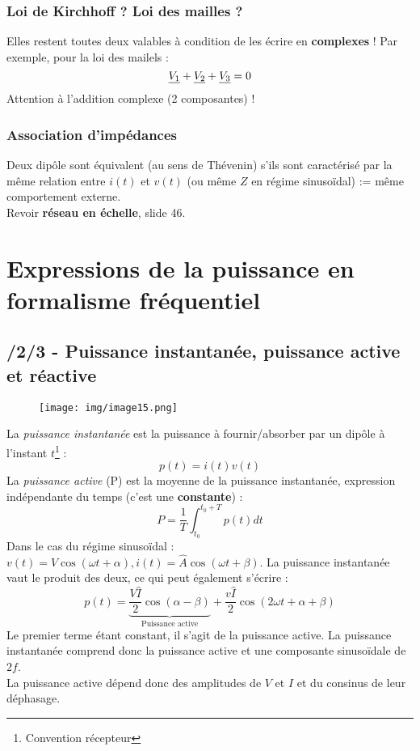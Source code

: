 \documentclass[british,french,11pt, a4paper, openany]{book}
\begin{document}
		\subsubsection{Loi de Kirchhoff ? Loi des mailles ?}
		Elles restent toutes deux valables à condition de les écrire en \textbf{complexes} ! Par exemple, pour la loi des mailels :
		\begin{equation}
		\underline{V_1} + \underline{V_2} + \underline{V_3} = 0
		\end{equation}
		Attention à l'addition complexe (2 composantes) !
		
		\subsubsection{Association d'impédances}
		Deux dipôle sont équivalent (au sens de Thévenin) s'ils sont caractérisé par la même relation entre $i(t)$ et $v(t)$ (ou même $Z$ en régime sinusoïdal) := même comportement externe.\\
		Revoir \textbf{réseau en échelle}, slide 46.
		
		\section{Expressions de la puissance en formalisme fréquentiel}
		\subsection{/2/3 - Puissance instantanée, puissance active et réactive}
		\begin{wrapfigure}[7]{l}{4.7cm}
			\texttt{[image: img/image15.png]}
		\end{wrapfigure}
		La \textit{puissance instantanée} est la puissance à fournir/absorber par un dipôle à l'instant $t$\footnote{Convention récepteur} :
		\begin{equation}
		p(t) = i(t)v(t)
		\end{equation}
		La \textit{puissance active} (P) est la moyenne de la puissance instantanée, expression indépendante du temps (c'est une \textbf{constante}) :
		\begin{equation}
		P = \frac{1}{T}\int_{t_0}^{t_0+T} p(t) dt
		\end{equation}
		Dans le cas du régime sinusoïdal : $v(t) = V\cos(\omega t + \alpha), i(t) = \hat A\cos(\omega t + \beta)$. La puissance instantanée vaut le produit des deux, ce qui peut également s'écrire :
		\begin{equation}
		p(t) = \underbrace{\frac{V\hat I}{2}\cos(\alpha - \beta)}_{\text{Puissance active}} + \frac{v\hat I}{2}\cos(2\omega t + \alpha + \beta)
		\end{equation}
		Le premier terme étant constant, il s'agit de la puissance active. La puissance instantanée comprend donc la puissance active et une composante sinusoïdale de $2f$.\\
		La puissance active dépend donc des amplitudes de $V$ et $I$ et du consinus de leur déphasage.\\
		
\end{document}
